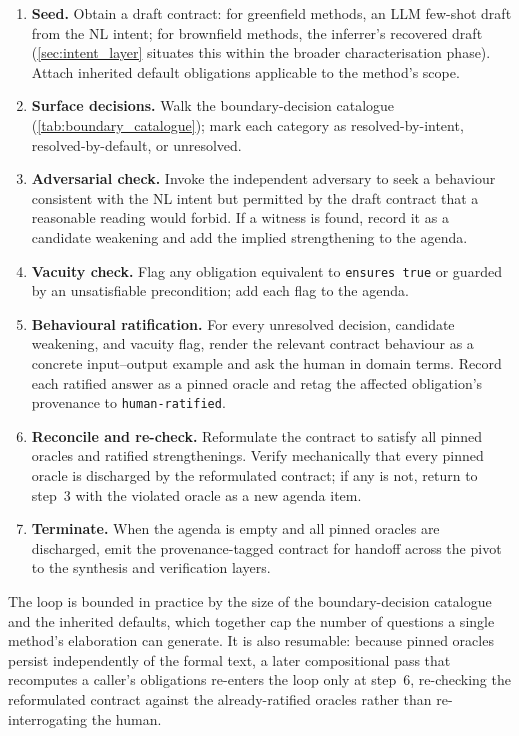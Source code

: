 \begin{enumerate}
\item \textbf{Seed.} Obtain a draft contract: for greenfield methods, an LLM few-shot draft from the NL intent; for brownfield methods, the inferrer's recovered draft (\cref{sec:intent_layer} situates this within the broader characterisation phase). Attach inherited default obligations applicable to the method's scope.
\item \textbf{Surface decisions.} Walk the boundary-decision catalogue (\cref{tab:boundary_catalogue}); mark each category as resolved-by-intent, resolved-by-default, or unresolved.
\item \textbf{Adversarial check.} Invoke the independent adversary to seek a behaviour consistent with the NL intent but permitted by the draft contract that a reasonable reading would forbid. If a witness is found, record it as a candidate weakening and add the implied strengthening to the agenda.
\item \textbf{Vacuity check.} Flag any obligation equivalent to \lstinline|ensures true| or guarded by an unsatisfiable precondition; add each flag to the agenda.
\item \textbf{Behavioural ratification.} For every unresolved decision, candidate weakening, and vacuity flag, render the relevant contract behaviour as a concrete input--output example and ask the human in domain terms. Record each ratified answer as a pinned oracle and retag the affected obligation's provenance to \texttt{human-ratified}.
\item \textbf{Reconcile and re-check.} Reformulate the contract to satisfy all pinned oracles and ratified strengthenings. Verify mechanically that every pinned oracle is discharged by the reformulated contract; if any is not, return to step~3 with the violated oracle as a new agenda item.
\item \textbf{Terminate.} When the agenda is empty and all pinned oracles are discharged, emit the provenance-tagged contract for handoff across the pivot to the synthesis and verification layers.
\end{enumerate}

The loop is bounded in practice by the size of the boundary-decision catalogue and the inherited defaults, which together cap the number of questions a single method's elaboration can generate. It is also resumable: because pinned oracles persist independently of the formal text, a later compositional pass that recomputes a caller's obligations re-enters the loop only at step~6, re-checking the reformulated contract against the already-ratified oracles rather than re-interrogating the human.

